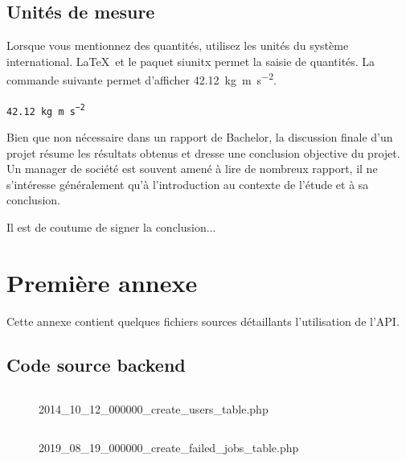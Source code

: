 \documentclass[
    iai, %
    eai, %
]{heig-tb}
\begin{document}
\section{Unités de mesure}

Lorsque vous mentionnez des quantités, utilisez les unités du système international. \LaTeX~et le paquet \textsf{siunitx} permet la saisie de quantités. La commande suivante permet d'afficher \SI{42.12}{\kilo\gram\metre\per\square\second}.\par

\texttt{\SI{42.12}{\kilo\gram\metre\per\square\second}}\par

Bien que non nécessaire dans un rapport de Bachelor, la discussion finale d'un projet résume les résultats obtenus et dresse une conclusion objective du projet. Un manager de société est souvent amené à lire de nombreux rapport, il ne s'intéresse généralement qu'à l'introduction au contexte de l'étude et à sa conclusion.

Il est de coutume de signer la conclusion...

\vfil
\hspace{8cm}\makeatletter\@author\makeatother\par
\hspace{8cm}\begin{minipage}{5cm}
  \printsignature
\end{minipage}
\clearpage

\appendix
\appendixpage
\addappheadtotoc

\chapter{Première annexe}
Cette annexe contient quelques fichiers sources détaillants l'utilisation de l'API.

\section{Code source backend}

\begin{figure}[h]
  \inputminted[breaklines]{javascript}{assets/code/2014_10_12_000000_create_users_table.php}
  \caption{2014\_10\_12\_000000\_create\_users\_table.php}
\end{figure}

\begin{figure}[h]
  \inputminted[breaklines]{javascript}{assets/code/2019_08_19_000000_create_failed_jobs_table.php}
  \caption{2019\_08\_19\_000000\_create\_failed\_jobs\_table.php}
\end{figure}
\end{document}
